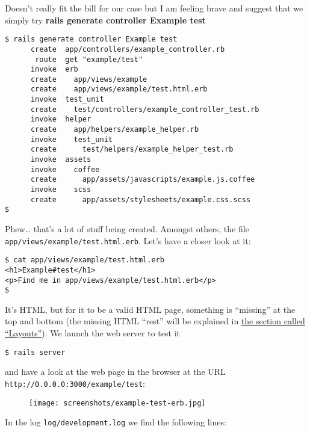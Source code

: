 \documentclass[a4paper]{book}
\begin{document}
Doesn't really fit the bill for our case but I am feeling brave and suggest that we simply try \textbf{rails generate controller Example test}

\begin{shaded}\begin{verbatim}
$ rails generate controller Example test
      create  app/controllers/example_controller.rb
       route  get "example/test"
      invoke  erb
      create    app/views/example
      create    app/views/example/test.html.erb
      invoke  test_unit
      create    test/controllers/example_controller_test.rb
      invoke  helper
      create    app/helpers/example_helper.rb
      invoke    test_unit
      create      test/helpers/example_helper_test.rb
      invoke  assets
      invoke    coffee
      create      app/assets/javascripts/example.js.coffee
      invoke    scss
      create      app/assets/stylesheets/example.css.scss
$
\end{verbatim}\end{shaded}

Phew\ldots{} that's a lot of stuff being created. Amongst others, the file \texttt{app/views/example/test.html.erb}. Let's have a closer look at it:

\begin{shaded}\begin{verbatim}
$ cat app/views/example/test.html.erb
<h1>Example#test</h1>
<p>Find me in app/views/example/test.html.erb</p>
$
\end{verbatim}\end{shaded}

It's HTML, but for it to be a valid HTML page, something is “missing” at the top and bottom (the missing HTML “rest” will be explained in \hyperref[erbux5flayouts]{the section called “Layouts”}). We launch the web server to test it

\begin{shaded}\begin{verbatim}
$ rails server
\end{verbatim}\end{shaded}

and have a look at the web page in the browser at the URL \texttt{http://0.0.0.0:3000/example/test}:

\begin{figure}[htbp]
\centering
\texttt{[image: screenshots/example-test-erb.jpg]}
\end{figure}

In the log \texttt{log/development.log} we find the following lines:
\end{document}
